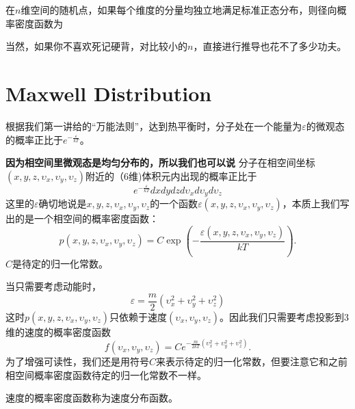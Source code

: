 \documentclass[CJK]{beamer}
\begin{document}
\begin{frame}
\bch
在$n$维空间的随机点，如果每个维度的分量均独立地满足标准正态分布，则径向概率密度函数为

当然，如果你不喜欢死记硬背，对比较小的$n$，直接进行推导也花不了多少功夫。
\ech
\end{frame}



\section{Maxwell Distribution}




\begin{frame}
\bch
{\large 


  根据我们第一讲给的“万能法则”，达到热平衡时，分子处在一个能量为$\varepsilon$的微观态的概率正比于$e^{-\frac{\varepsilon}{kT}}$。

  {\bf 因为相空间里微观态是均匀分布的，所以我们也可以说} 分子在相空间坐标$(x,y,z,\upsilon_x,\upsilon_y,\upsilon_z)$附近的（6维)体积元内出现的概率正比于
$$ e^{-\frac{\varepsilon}{kT}} dx dy dz d\upsilon_x d\upsilon_y d\upsilon_z$$
  这里的$\varepsilon$确切地说是$x,y,z,\upsilon_x,\upsilon_y,\upsilon_z$的一个函数$\varepsilon(x,y,z,\upsilon_x,\upsilon_y, \upsilon_z)$，本质上我们写出的是一个相空间的概率密度函数：
  $$ p(x,y,z,\upsilon_x,\upsilon_y, \upsilon_z) = C \exp\left(-\frac{\varepsilon(x,y,z,\upsilon_x,\upsilon_y, \upsilon_z)}{kT}\right).$$
$C$是待定的归一化常数。
}
\ech
\end{frame}


\begin{frame}
\bch
    {\large
      当只需要考虑动能时，
      $$\varepsilon = \frac{m}{2}(\upsilon_x^2+\upsilon_y^2 + \upsilon_z^2)$$
      这时$p(x,y,z,\upsilon_x,\upsilon_y, \upsilon_z)$只依赖于速度$(\upsilon_x,\upsilon_y, \upsilon_z)$。因此我们只需要考虑投影到3维的速度的概率密度函数
      $$f(\upsilon_x,\upsilon_y, \upsilon_z) = C e^{-\frac{m}{2kT}(\upsilon_x^2+\upsilon_y^2 + \upsilon_z^2)}.$$
      为了增强可读性，我们还是用符号$C$来表示待定的归一化常数，但要注意它和之前相空间概率密度函数待定的归一化常数不一样。
      
      速度的概率密度函数称为{\blue 速度分布函数}。
      }
\ech
\end{frame}
\end{document}
